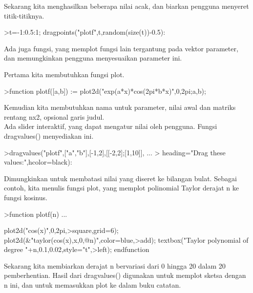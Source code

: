\documentclass[a4paper,10pt]{article}
\begin{document}
\begin{eulernotebook}
\begin{eulercomment}
\begin{eulercomment}
\begin{eulercomment}
\begin{eulercomment}
\begin{eulercomment}
Sekarang kita menghasilkan beberapa nilai acak, dan biarkan pengguna
menyeret titik-titiknya.
\end{eulercomment}
\begin{eulerprompt}
>t=-1:0.5:1; dragpoints("plotf",t,random(size(t))-0.5):
\end{eulerprompt}
\begin{eulercomment}
Ada juga fungsi, yang memplot fungsi lain tergantung pada vektor
parameter, dan memungkinkan pengguna menyesuaikan parameter ini.

Pertama kita membutuhkan fungsi plot.
\end{eulercomment}
\begin{eulerprompt}
>function plotf([a,b]) := plot2d("exp(a*x)*cos(2pi*b*x)",0,2pi;a,b);
\end{eulerprompt}
\begin{eulercomment}
Kemudian kita membutuhkan nama untuk parameter, nilai awal dan matriks
rentang nx2, opsional garis judul.\\
Ada slider interaktif, yang dapat mengatur nilai oleh pengguna. Fungsi
dragvalues() menyediakan ini.
\end{eulercomment}
\begin{eulerprompt}
>dragvalues("plotf",["a","b"],[-1,2],[[-2,2];[1,10]], ...
>  heading="Drag these values:",hcolor=black):
\end{eulerprompt}
\begin{eulercomment}
Dimungkinkan untuk membatasi nilai yang diseret ke bilangan bulat.
Sebagai contoh, kita menulis fungsi plot, yang memplot polinomial
Taylor derajat n ke fungsi kosinus.
\end{eulercomment}
\begin{eulerprompt}
>function plotf(n) ...
\end{eulerprompt}
\begin{eulerudf}
  plot2d("cos(x)",0,2pi,>square,grid=6);
  plot2d(&"taylor(cos(x),x,0,@n)",color=blue,>add);
  textbox("Taylor polynomial of degree "+n,0.1,0.02,style="t",>left);
  endfunction
\end{eulerudf}
\begin{eulercomment}
Sekarang kita membiarkan derajat n bervariasi dari 0 hingga 20 dalam
20 pemberhentian. Hasil dari dragvalues() digunakan untuk memplot
sketsa dengan n ini, dan untuk memasukkan plot ke dalam buku catatan.
\end{eulercomment}
\begin{eulerprompt}

\end{eulerprompt}
\end{eulercomment}
\end{eulercomment}
\end{eulercomment}
\end{eulercomment}
\end{eulernotebook}
\end{document}
